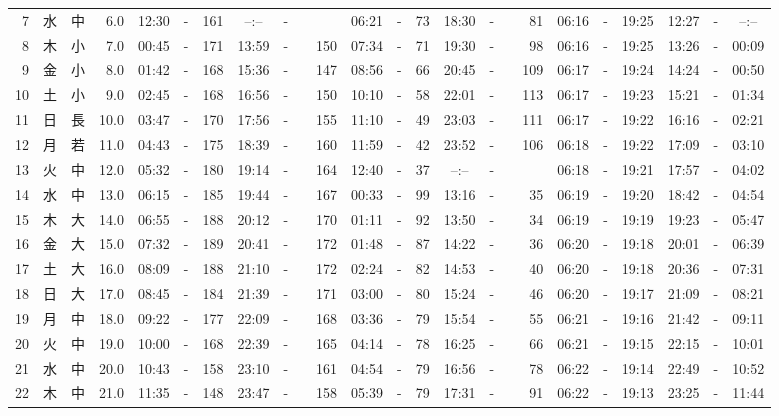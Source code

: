 \documentclass[12pt,a4j]{jsarticle}
\begin{document}
\begin{table}[htbp]
\begin{center}
{\begin{tabular}{|rc|cr|ccrccr|ccrccr|ccc|ccc|}
 7 & 水 & 中 &  6.0 &  12:30 &-& 161 &  --:-- &-&~~~~~ &  06:21 &-&  73 &  18:30 &-&  81 & 06:16 & -& 19:25 & 12:27 & -& --:-- \\
 8 & 木 & 小 &  7.0 &  00:45 &-& 171 &  13:59 &-& 150 &  07:34 &-&  71 &  19:30 &-&  98 & 06:16 & -& 19:25 & 13:26 & -& 00:09 \\
 9 & 金 & 小 &  8.0 &  01:42 &-& 168 &  15:36 &-& 147 &  08:56 &-&  66 &  20:45 &-& 109 & 06:17 & -& 19:24 & 14:24 & -& 00:50 \\
10 & 土 & 小 &  9.0 &  02:45 &-& 168 &  16:56 &-& 150 &  10:10 &-&  58 &  22:01 &-& 113 & 06:17 & -& 19:23 & 15:21 & -& 01:34 \\
11 & 日 & 長 & 10.0 &  03:47 &-& 170 &  17:56 &-& 155 &  11:10 &-&  49 &  23:03 &-& 111 & 06:17 & -& 19:22 & 16:16 & -& 02:21 \\
12 & 月 & 若 & 11.0 &  04:43 &-& 175 &  18:39 &-& 160 &  11:59 &-&  42 &  23:52 &-& 106 & 06:18 & -& 19:22 & 17:09 & -& 03:10 \\
13 & 火 & 中 & 12.0 &  05:32 &-& 180 &  19:14 &-& 164 &  12:40 &-&  37 &  --:-- &-&~~~~~ & 06:18 & -& 19:21 & 17:57 & -& 04:02 \\
14 & 水 & 中 & 13.0 &  06:15 &-& 185 &  19:44 &-& 167 &  00:33 &-&  99 &  13:16 &-&  35 & 06:19 & -& 19:20 & 18:42 & -& 04:54 \\
15 & 木 & 大 & 14.0 &  06:55 &-& 188 &  20:12 &-& 170 &  01:11 &-&  92 &  13:50 &-&  34 & 06:19 & -& 19:19 & 19:23 & -& 05:47 \\
16 & 金 & 大 & 15.0 &  07:32 &-& 189 &  20:41 &-& 172 &  01:48 &-&  87 &  14:22 &-&  36 & 06:20 & -& 19:18 & 20:01 & -& 06:39 \\
17 & 土 & 大 & 16.0 &  08:09 &-& 188 &  21:10 &-& 172 &  02:24 &-&  82 &  14:53 &-&  40 & 06:20 & -& 19:18 & 20:36 & -& 07:31 \\
18 & 日 & 大 & 17.0 &  08:45 &-& 184 &  21:39 &-& 171 &  03:00 &-&  80 &  15:24 &-&  46 & 06:20 & -& 19:17 & 21:09 & -& 08:21 \\
19 & 月 & 中 & 18.0 &  09:22 &-& 177 &  22:09 &-& 168 &  03:36 &-&  79 &  15:54 &-&  55 & 06:21 & -& 19:16 & 21:42 & -& 09:11 \\
20 & 火 & 中 & 19.0 &  10:00 &-& 168 &  22:39 &-& 165 &  04:14 &-&  78 &  16:25 &-&  66 & 06:21 & -& 19:15 & 22:15 & -& 10:01 \\
21 & 水 & 中 & 20.0 &  10:43 &-& 158 &  23:10 &-& 161 &  04:54 &-&  79 &  16:56 &-&  78 & 06:22 & -& 19:14 & 22:49 & -& 10:52 \\
22 & 木 & 中 & 21.0 &  11:35 &-& 148 &  23:47 &-& 158 &  05:39 &-&  79 &  17:31 &-&  91 & 06:22 & -& 19:13 & 23:25 & -& 11:44 \\

\end{tabular}}
\end{center}
\end{table}
\end{document}
